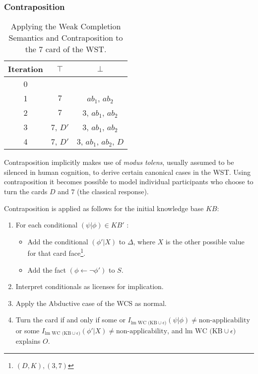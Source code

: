 \subsubsection*{Contraposition}
\begin{table}
\begin{center}
\begin{tabular}{ c c c }
 \textbf{Iteration} & \textbf{$\top$} & \textbf{$\bot$} \\ 
 \hline
 0 &  &  \\  
 1 &  $7$ & $ab_1$, $ab_2$  \\  
 2 &  $7$ & $3$, $ab_1$, $ab_2$  \\
 3 &  $7$, $D'$ & $3$, $ab_1$, $ab_2$  \\
 4 &  $7$, $D'$ & $3$, $ab_1$, $ab_2$, $D$  
\end{tabular}
\caption{Applying the Weak Completion Semantics and Contraposition to the $7$ card of the WST.}
\label{tbl:7cont}
\end{center}
\end{table}

Contraposition implicitly makes use of \textit{modus tolens}, usually assumed to be silenced in human cognition, to derive certain canonical cases in the WST. Using contraposition it becomes possible to model individual participants who choose to turn the cards $D$ and $7$ (the classical response).

Contraposition is applied as follows for the initial knowledge base $KB$:
\begin{enumerate}
\item For each conditional $(\psi|\phi)\in KB'$ :
\begin{itemize}
\item Add the conditional $(\phi'|X)$ to $\Delta$, where $X$ is the other possible value for that card face\footnote{$(D,K),(3,7)$}.
\item Add the fact $(\phi\leftarrow \lnot \phi')$ to $S$.
\end{itemize}
\item Interpret conditionals as licenses for implication.
\item Apply the Abductive case of the WCS as normal.
\item Turn the card if and only if some or $I_{\text{lm WC (KB} \cup \epsilon)}(\psi|\phi)\neq\textrm{non-applicability}$ or some $I_{\text{lm WC (KB} \cup \epsilon)}(\phi'|X)\neq\textrm{non-applicability}$, and $\text{lm WC (KB} \cup \epsilon)$ explains $O$.
\end{enumerate}

